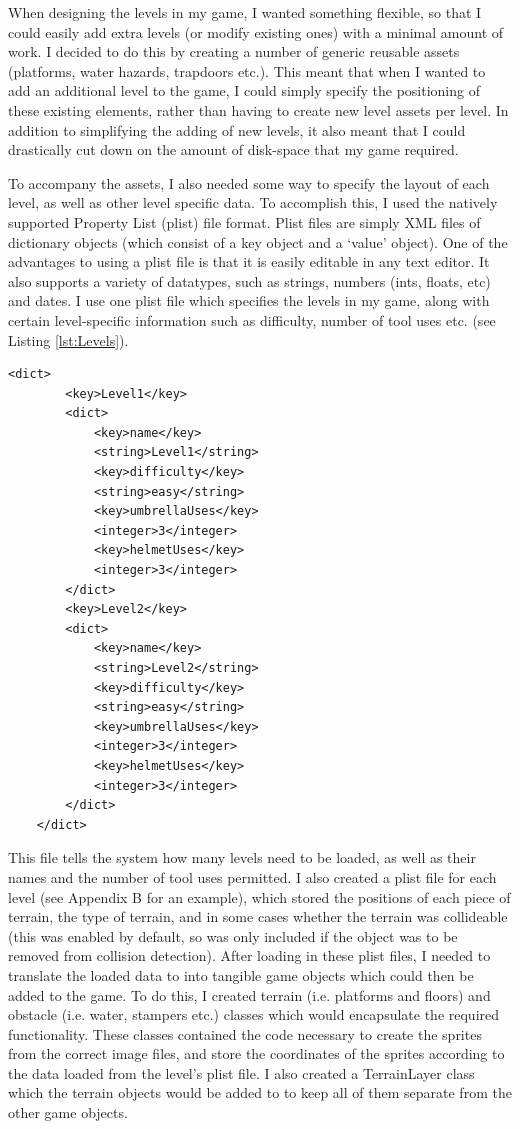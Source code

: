 \documentclass[a4paper,oneside]{report}
\begin{document}
When designing the levels in my game, I wanted something flexible, so that I could easily add extra levels (or modify existing ones) with a minimal amount of work. I decided to do this by creating a number of generic reusable assets (platforms, water hazards, trapdoors etc.). This meant that when I wanted to add an additional level to the game, I could simply specify the positioning of these existing elements, rather than having to create new level assets per level. In addition to simplifying the adding of new levels, it also meant that I could drastically cut down on the amount of disk-space that my game required.

To accompany the assets, I also needed some way to specify the layout of each level, as well as other level specific data. To accomplish this, I used the natively supported Property List (plist) file format. Plist files are simply XML files of dictionary objects (which consist of a key object and a `value' object). One of the advantages to using a plist file is that it is easily editable in any text editor. It also supports a variety of datatypes, such as strings, numbers (ints, floats, etc) and dates. I use one plist file which specifies the levels in my game, along with certain level-specific information such as difficulty, number of tool uses etc. (see Listing \ref{lst:Levels}).
\newpage

\begin{lstlisting}[label={lst:Levels},caption=An Example Level List]
    <dict>
    	<key>Level1</key>
    	<dict>
    		<key>name</key>
    		<string>Level1</string>
    		<key>difficulty</key>
    		<string>easy</string>
    		<key>umbrellaUses</key>
    		<integer>3</integer>
    		<key>helmetUses</key>
    		<integer>3</integer>
    	</dict>
    	<key>Level2</key>
	    <dict>
    		<key>name</key>
    		<string>Level2</string>
    		<key>difficulty</key>
    		<string>easy</string>
    		<key>umbrellaUses</key>
    		<integer>3</integer>
    		<key>helmetUses</key>
    		<integer>3</integer>
    	</dict>
    </dict>
\end{lstlisting}

This file tells the system how many levels need to be loaded, as well as their names and the number of tool uses permitted. I also created a plist file for each level (see Appendix B for an example), which stored the positions of each piece of terrain, the type of terrain, and in some cases whether the terrain was collideable (this was enabled by default, so was only included if the object was to be removed from collision detection). After loading in these plist files, I needed to translate the loaded data to into tangible game objects which could then be added to the game. To do this, I created terrain (i.e. platforms and floors) and obstacle (i.e. water, stampers etc.) classes which would encapsulate the required functionality. These classes contained the code necessary to create the sprites from the correct image files, and store the coordinates of the sprites according to the data loaded from the level's plist file. I also created a TerrainLayer class which the terrain objects would be added to to keep all of them separate from the other game objects.
\end{document}
